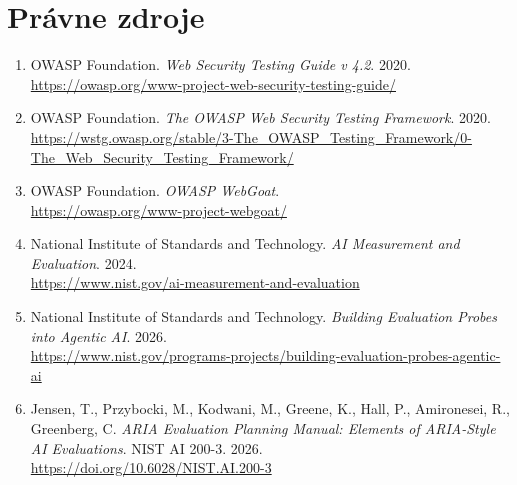 \documentclass[11pt,a4paper]{article}
\begin{document}
\section*{Právne zdroje}

\begin{enumerate}

\item OWASP Foundation. \textit{Web Security Testing Guide v 4.2}. 2020.\\
\url{https://owasp.org/www-project-web-security-testing-guide/}

\item OWASP Foundation. \textit{The OWASP Web Security Testing Framework}. 2020.\\
\url{https://wstg.owasp.org/stable/3-The_OWASP_Testing_Framework/0-The_Web_Security_Testing_Framework/}

\item OWASP Foundation. \textit{OWASP WebGoat}.\\
\url{https://owasp.org/www-project-webgoat/}

\item National Institute of Standards and Technology. \textit{AI Measurement and Evaluation}. 2024.\\
\url{https://www.nist.gov/ai-measurement-and-evaluation}

\item National Institute of Standards and Technology. \textit{Building Evaluation Probes into Agentic AI}. 2026.\\
\url{https://www.nist.gov/programs-projects/building-evaluation-probes-agentic-ai}

\item Jensen, T., Przybocki, M., Kodwani, M., Greene, K., Hall, P., Amironesei, R., Greenberg, C. \textit{ARIA Evaluation Planning Manual: Elements of ARIA-Style AI Evaluations}. NIST AI 200-3. 2026.\\
\url{https://doi.org/10.6028/NIST.AI.200-3}

\end{enumerate}
\end{document}
